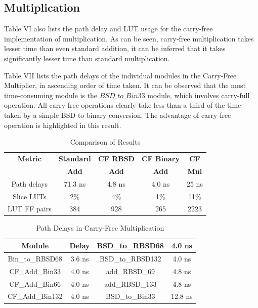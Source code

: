 \documentclass[conference]{IEEEtran}
\begin{document}
\subsection{Multiplication}

Table VI also lists the path delay and LUT usage for the carry-free implementation of multiplication. As can be seen, carry-free multiplication takes lesser time than even standard addition, it can be inferred that it takes significantly lesser time than standard multiplication.

Table VII lists the path delays of the individual modules in the Carry-Free Multiplier, in ascending order of time taken. It can be observed that the most time-consuming module is the $BSD\_to\_Bin33$ module, which involves carry-full operation. All carry-free operations clearly take less than a third of the time taken by a simple BSD to binary conversion. The advantage of carry-free operation is highlighted in this result.

\vspace{-.5em}
\begin{table}[h!]
  \centering
  \caption{Comparison of Results}
  \label{tab:table6}
  \begin{tabular}{|c|c|c|c|c|}
    \hline
    \textbf{Metric} & \textbf{Standard} & \textbf{CF RBSD} & \textbf{CF Binary} & \textbf{CF} \\
    & \textbf{Add} & \textbf{Add} & \textbf{Add} & \textbf{Mul} \\
    \hline
    \hline
    Path delays & 71.3 ns & 4.8 ns & 4.0 ns & 25 ns \\
    \hline
    Slice LUTs & 2\% & 4\% & 1\% & 11\% \\
    \hline
    LUT FF pairs & 384 & 928 & 265 & 2223 \\
    \hline
  \end{tabular}
\end{table}

\vspace{-.5em}
\begin{table}[h!]
  \centering
  \caption{Path Delays in Carry-Free Multiplication}
  \label{tab:table7}
  \begin{tabular}{|c|c||c|c|}
    \hline
    \textbf{Module} & \textbf{Delay} & BSD\_to\_RBSD68 & 4.0 ns \\
    \hline
    Bin\_to\_RBSD68 & 3.6 ns & BSD\_to\_RBSD132 & 4.0 ns \\
    \hline
    CF\_Add\_Bin33 & 4.0 ns & add\_RBSD\_69 & 4.8 ns \\
    \hline
    CF\_Add\_Bin66 & 4.0 ns & add\_RBSD\_133 & 4.8 ns \\
    \hline
    CF\_Add\_Bin132 & 4.0 ns & BSD\_to\_Bin33 & 12.8 ns \\
    \hline
  \end{tabular}
\end{table}
\end{document}
